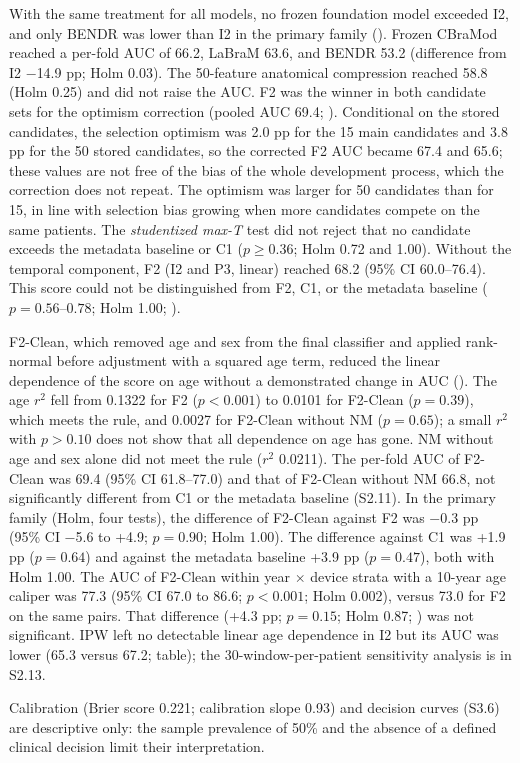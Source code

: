 With the same treatment for all models, no frozen foundation model exceeded I2, and only BENDR was lower than I2 in the primary family ().
Frozen CBraMod reached a per-fold AUC of 66.2, LaBraM 63.6, and BENDR 53.2 (difference from I2 $-$14.9 pp; Holm 0.03). The 50-feature anatomical compression reached 58.8 (Holm 0.25) and did not raise the AUC.
F2 was the winner in both candidate sets for the optimism correction (pooled AUC 69.4; ).
Conditional on the stored candidates, the selection optimism was 2.0 pp for the 15 main candidates and 3.8 pp for the 50 stored candidates, so the corrected F2 AUC became 67.4 and 65.6; these values are not free of the bias of the whole development process, which the correction does not repeat.
The optimism was larger for 50 candidates than for 15, in line with selection bias growing when more candidates compete on the same patients.
The \textit{studentized max-T} test did not reject that no candidate exceeds the metadata baseline or C1 ($p \geq 0.36$; Holm 0.72 and 1.00). Without the temporal component, F2 (I2 and P3, linear) reached 68.2 (95\% CI 60.0--76.4).
This score could not be distinguished from F2, C1, or the metadata baseline ($p = 0.56$--$0.78$; Holm 1.00; ).



F2-Clean, which removed age and sex from the final classifier and applied rank-normal before adjustment with a squared age term, reduced the linear dependence of the score on age without a demonstrated change in AUC ().
The age $r^2$ fell from 0.1322 for F2 ($p<0.001$) to 0.0101 for F2-Clean ($p = 0.39$), which meets the rule, and 0.0027 for F2-Clean without NM ($p = 0.65$); a small $r^2$ with $p>0.10$ does not show that all dependence on age has gone.
NM without age and sex alone did not meet the rule ($r^2$ 0.0211).
The per-fold AUC of F2-Clean was 69.4 (95\% CI 61.8--77.0) and that of F2-Clean without NM 66.8, not significantly different from C1 or the metadata baseline (S2.11).
In the primary family (Holm, four tests), the difference of F2-Clean against F2 was $-$0.3 pp (95\% CI $-$5.6 to +4.9; $p = 0.90$; Holm 1.00).
The difference against C1 was +1.9 pp ($p = 0.64$) and against the metadata baseline +3.9 pp ($p = 0.47$), both with Holm 1.00. The AUC of F2-Clean within year $\times$ device strata with a 10-year age caliper was 77.3 (95\% CI 67.0 to 86.6; $p<0.001$; Holm 0.002), versus 73.0 for F2 on the same pairs. That difference (+4.3 pp; $p = 0.15$; Holm 0.87; ) was not significant.
IPW left no detectable linear age dependence in I2 but its AUC was lower (65.3 versus 67.2; table); the 30-window-per-patient sensitivity analysis is in S2.13.



Calibration (Brier score 0.221; calibration slope 0.93) and decision curves (S3.6) are descriptive only: the sample prevalence of 50\% and the absence of a defined clinical decision limit their interpretation.
